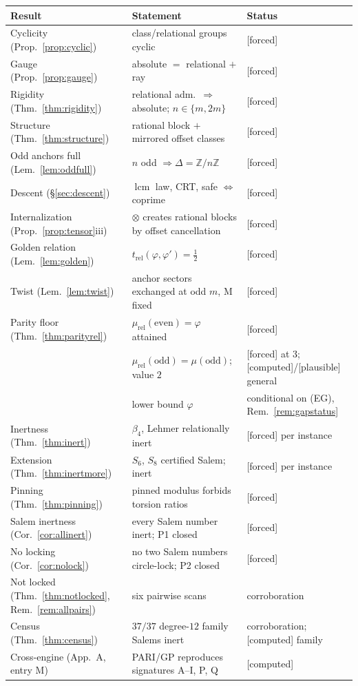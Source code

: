 \documentclass[11pt]{article}
\theoremstyle{plain}
\theoremstyle{definition}
\theoremstyle{remark}
\newcommand{\Z}{\mathbb{Z}}
\newcommand{\Mah}{\mathrm{M}}
\DeclareMathOperator{\lcm}{lcm}
\newcommand{\F}{\textnormal{[forced]}}
\newcommand{\C}{\textnormal{[computed]}}
\newcommand{\Pl}{\textnormal{[plausible]}}
\begin{document}
\begin{center}
\small
\begin{tabular}{p{4.9cm}p{5.6cm}p{3.6cm}}
\hline
Result & Statement & Status\\
\hline
Cyclicity (Prop.~\ref{prop:cyclic}) & class/relational groups cyclic & \F\\
Gauge (Prop.~\ref{prop:gauge}) & absolute $=$ relational $+$ ray & \F\\
Rigidity (Thm.~\ref{thm:rigidity}) & relational adm.\ $\Rightarrow$ absolute; $n\in\{m,2m\}$ & \F\\
Structure (Thm.~\ref{thm:structure}) & rational block $+$ mirrored offset classes & \F\\
Odd anchors full (Lem.~\ref{lem:oddfull}) & $n$ odd $\Rightarrow\Delta=\Z/n\Z$ & \F\\
Descent (\S\ref{sec:descent}) & $\lcm$ law, CRT, safe $\Leftrightarrow$ coprime & \F\\
Internalization (Prop.~\ref{prop:tensor}iii) & $\otimes$ creates rational blocks by offset cancellation & \F\\
Golden relation (Lem.~\ref{lem:golden}) & $t_{\mathrm{rel}}(\varphi,\varphi')=\tfrac12$ & \F\\
Twist (Lem.~\ref{lem:twist}) & anchor sectors exchanged at odd $m$, $\Mah$ fixed & \F\\
Parity floor (Thm.~\ref{thm:parityrel}) & $\mu_{\mathrm{rel}}(\text{even})=\varphi$ attained & \F\\
 & $\mu_{\mathrm{rel}}(\text{odd})=\mu(\text{odd})$; value $2$ & \F{} at $3$; \C/\Pl{} general\\
 & lower bound $\varphi$ & conditional on (EG), Rem.~\ref{rem:gapstatus}\\
Inertness (Thm.~\ref{thm:inert}) & $\beta_4$, Lehmer relationally inert & \F{} per instance\\
Extension (Thm.~\ref{thm:inertmore}) & $S_6$, $S_8$ certified Salem; inert & \F{} per instance\\
Pinning (Thm.~\ref{thm:pinning}) & pinned modulus forbids torsion ratios & \F\\
Salem inertness (Cor.~\ref{cor:allinert}) & every Salem number inert; P1 closed & \F\\
No locking (Cor.~\ref{cor:nolock}) & no two Salem numbers circle-lock; P2 closed & \F\\
Not locked (Thm.~\ref{thm:notlocked}, Rem.~\ref{rem:allpairs}) & six pairwise scans & corroboration\\
Census (Thm.~\ref{thm:census}) & $37/37$ degree-$12$ family Salems inert & corroboration; \C{} family\\
Cross-engine (App.~A, entry M) & PARI/GP reproduces signatures A--I, P, Q & \C\\
\hline
\end{tabular}
\end{center}
\end{document}
